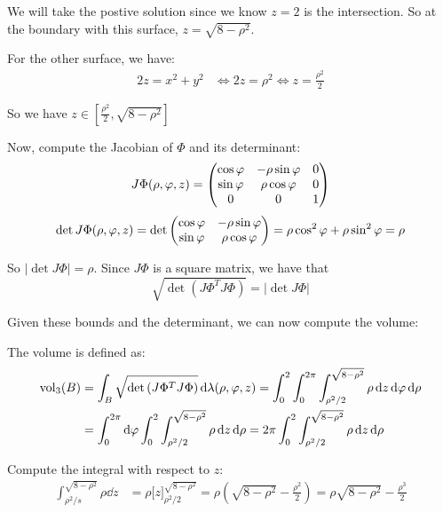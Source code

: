 \documentclass[12pt]{article}
\begin{document}
We will take the postive solution since we know $z = 2$ is the intersection. So at the boundary with this surface, $z = \sqrt{8 - \rho^2}$.

For the other surface, we have:
$$
\begin{aligned}
    2z = x^2 + y^2 &\iff 2z = \rho^2 \iff z = \frac{\rho^2}{2}
\end{aligned}
$$

So we have $z \in \left[\frac{\rho^2}{2}, \sqrt{8 - \rho^2}\right]$

Now, compute the Jacobian of $\Phi$ and its determinant:
$$
\begin{aligned}
    J \Phi(\rho, \varphi, z) = 
    \begin{pmatrix}
        \cos\varphi & -\rho\sin\varphi & 0 \\
        \sin\varphi & \rho\cos\varphi & 0 \\
        0 & 0 & 1 \\
    \end{pmatrix}
\end{aligned}
$$
$$
\det J\Phi(\rho,\varphi,z) = \det 
        \begin{pmatrix}
            \cos\varphi & -\rho\sin\varphi \\
        \sin\varphi & \rho\cos\varphi \\
        \end{pmatrix}
    = \rho\cos^2\varphi + \rho\sin^2\varphi = \rho
$$

So $|\det J \Phi| = \rho$. Since $J\Phi$ is a square matrix, we have that
$$
    \sqrt{\det\left(J\Phi^T J \Phi\right)} = |\det J \Phi|
$$



Given these bounds and the determinant, we can now compute the volume:

The volume is defined as:
$$
\begin{aligned}
    \mathrm{vol}_3(B) &= \int_B \sqrt{\det\left(J\Phi^T J \Phi\right)} \dd \lambda(\rho, \vphi, z) = \int_{0}^{2} \int_{0}^{2\pi} \int_{\rho^2/2}^{\sqrt{8 - \rho^2}} \rho \dd z \dd \vphi \dd \rho \\
    &= \int_{0}^{2\pi} \dd \vphi \int_{0}^{2} \int_{\rho^2/2}^{\sqrt{8 - \rho^2}} \rho \dd z \dd \rho = 2\pi \int_{0}^{2} \int_{\rho^2/2}^{\sqrt{8 - \rho^2}} \rho \dd z \dd \rho
\end{aligned}
$$

Compute the integral with respect to $z$:
$$
\begin{aligned}
    \int_{\rho^2/s}^{\sqrt{8 - \rho^2}} \rho \dd z &= \rho \Big[ z\Big]_{\rho^2/2}^{\sqrt{8 - \rho^2}} = \rho \left(\sqrt{8 - \rho^2} - \frac{\rho^2}{2}\right) = \rho\sqrt{8 - \rho^2} - \frac{\rho^3}{2}
\end{aligned}
$$
\end{document}
